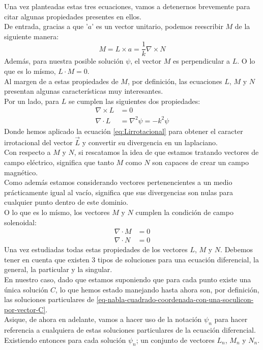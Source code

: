 \documentclass{article}
\begin{document}
Una vez planteadas estas tres ecuaciones, vamos a detenernos brevemente para citar algunas propiedades presentes en ellos.\\
De entrada, gracias a que '$a$' es un vector unitario, podemos reescribir $M$ de la siguiente manera:    
\begin{equation}
M= L \times a = \frac{1}{k}\nabla \times N
\label{eq-M-reescrito}
\end{equation}
Además,  para nuestra posible solución $\psi$, el vector $M$ es perpendicular a $L$. O lo que es lo mísmo, $L\cdot M=0$.\\

Al margen de a estas propiedades de $M$, por definición, las ecuaciones $L$, $M$ y $N$ presentan algunas características muy interesantes.\\
Por un lado, para $L$ se cumplen las siguientes dos propiedades:
\begin{align}
    \nabla  \times L &=0 \\
    \nabla  \cdot L  &=\nabla^2\psi = -k^2 \psi
\end{align}
Donde hemos aplicado la ecuación \eqref{eq:Lirrotacional} para obtener el caracter irrotacional del vector $\vec{L}$ y convertir su divergencia en un laplaciano. \\
Con respecto a  $M$ y $N$, si rescatamos la idea de que estamos tratando vectores de campo eléctrico, significa que tanto $M$ como $N$ son capaces de crear un campo magnético.\\
Como además estamos considerando vectores pertenencientes a un medio prácticamente igual al vacío, significa que sus divergencias son nulas para cualquier punto dentro de este dominio.\\
O lo que es lo mísmo,  los vectores $M$ y $N$ cumplen la condición de campo solenoidal:
\begin{align}
    \nabla\cdot M &= 0
    \label{M-cumplen-ser-campo-solenoidal}\\
    \nabla\cdot N &= 0
    \label{N-cumplen-ser-campo-solenoidal}
\end{align}
\newpage
Una vez estudiadas todas estas propiedades de los vectores $L$, $M$ y $N$. Debemos tener en cuenta que existen 3 tipos de soluciones para una ecuación diferencial, la general, la particular y la singular.\\
En nuestro caso, dado que estamos suponiendo que para cada punto existe una única solución $C$, lo que hemos estado manejando hasta ahora son, por definición, las soluciones particulares de \eqref{eq-nabla-cuadrado-coordenada-con-una-soculicon-por-vector-C}. \\
Asique, de ahora en adelante, vamos a hacer uso de la notación $\psi_{n}$ para hacer referencia a cualquiera de estas soluciones particulares de la ecuación diferencial. Existiendo entonces para cada solución  $\psi_{n}$; un conjunto de vectores $L_{n}$, $M_{n}$ y $N_{n}$.
\\
\end{document}

